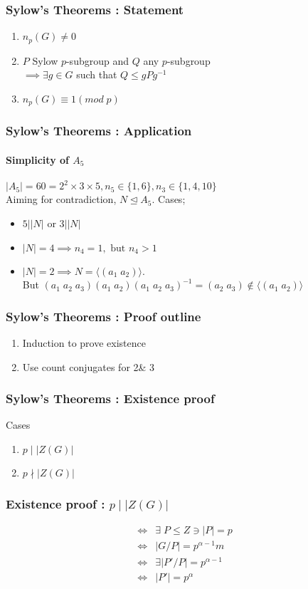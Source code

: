\documentclass{beamer}
\begin{document}
\begin{frame}
    \frametitle{Sylow's Theorems : Statement}
    \begin{enumerate}
        \item $n_p(G) \neq 0$
        \item $P$ Sylow $p$-subgroup and $Q$ any $p$-subgroup\\
            $\implies\exists g\in G$ such that $Q\leq gPg^{-1}$
        \item $n_p(G)\equiv 1(mod\; p)$
    \end{enumerate}
\end{frame}

\begin{frame}
    \frametitle{Sylow's Theorems : Application}
    \framesubtitle{Simplicity of $A_5$}
    $|A_5| = 60 = 2^2\times 3\times 5, n_5\in \{1,6\}, n_3\in \{1,4,10\}$\\
    Aiming for contradiction, $N\trianglelefteq A_5$. Cases;
    \begin{itemize}
        \item $5 | |N|$ or $3 | |N|$
        \item $|N| = 4\implies n_4 = 1, \textrm{ but } n_4 > 1$
        \item $|N| = 2\implies N = \langle (a_1\;a_2)\rangle$.\\
            But $(a_1\;a_2\;a_3)(a_1\;a_2)(a_1\;a_2\;a_3)^{-1} = (a_2\;a_3)\notin \langle (a_1\;a_2)\rangle$
    \end{itemize}
\end{frame}

\begin{frame}
    \frametitle{Sylow's Theorems : Proof outline}
    \begin{enumerate}
        \item Induction to prove existence
        \item Use count conjugates for 2\& 3
    \end{enumerate}
\end{frame}

\begin{frame}
    \frametitle{Sylow's Theorems : Existence proof}
    Cases
    \begin{enumerate}
        \item $p\mid |Z(G)|$
        \item $p\nmid |Z(G)|$
    \end{enumerate}
\end{frame}

\begin{frame}
    \frametitle{Existence proof : $p\mid |Z(G)|$}
    \begin{align*}
        \iff&\exists\; P\leq Z\ni |P| = p\\
        \iff& |G/P| = p^{\alpha - 1} m\\
        \iff& \exists |P'/P| = p^{\alpha - 1}\\
        \iff& |P'| = p^\alpha
    \end{align*}
\end{frame}
\end{document}
